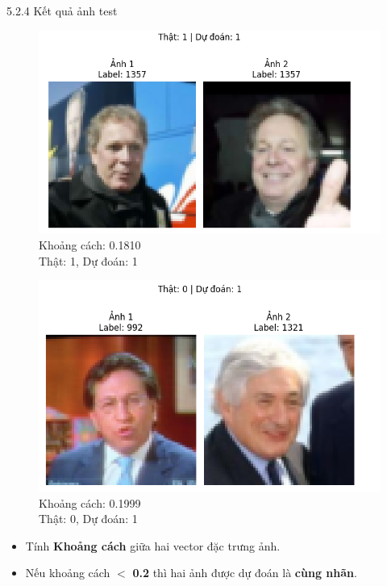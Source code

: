 \begin{frame}{5.2.4 Kết quả ảnh test}
\vspace{-0.5em}

\begin{minipage}[t]{0.48\textwidth}
    \centering
    \begin{figure}
    \includegraphics[width=0.95\linewidth]{img/05-1.png}
    {Khoảng cách: 0.1810\\Thật: 1, Dự đoán: 1}
    \end{figure}
\end{minipage}
\hfill
\begin{minipage}[t]{0.48\textwidth}
    \centering
    \begin{figure}
        \includegraphics[width=0.95\linewidth]{img/05-2.png}
        {Khoảng cách: 0.1999\\Thật: 0, Dự đoán: 1}
    \end{figure}
        
\end{minipage}

\begin{itemize}
    \item  Tính \textbf{Khoảng cách} giữa hai vector đặc trưng ảnh.
    \item Nếu khoảng cách $<$ \textbf{0.2} thì hai ảnh được dự đoán là \textbf{cùng nhãn}.
\end{itemize}
\end{frame}


